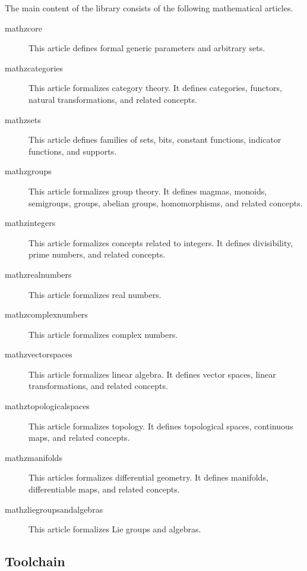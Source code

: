 \documentclass{amsart}
\begin{document}
The main content of the library consists of the following mathematical articles.
\begin{description}
\item[mathz\-core] This article defines formal generic parameters and arbitrary sets.
\item[mathz\-categories] This article formalizes category theory.
It defines categories, functors, natural transformations, and related concepts.
\item[mathz\-sets] This article defines families of sets, bits, constant functions, indicator functions, and supports.
\item[mathz\-groups] This article formalizes group theory.
It defines magmas, monoids, semigroups, groups, abelian groups, homomorphisms, and related concepts.
\item[mathz\-integers] This article formalizes concepts related to integers. It defines divisibility, prime numbers, and related concepts.
\item[mathz\-real\-numbers] This article formalizes real numbers.
\item[mathz\-complex\-numbers] This article formalizes complex numbers.
\item[mathz\-vector\-spaces] This article formalizes linear algebra. It defines vector spaces, linear transformations, and related concepts.
\item[mathz\-topological\-spaces] This article formalizes topology. It defines topological spaces, continuous maps, and related concepts.
\item[mathz\-manifolds] This articles formalizes differential geometry. It defines manifolds, differentiable maps, and related concepts.
\item[mathz\-lie\-groups\-and\-algebras] This article formalizes Lie groups and algebras.
\end{description}

\subsection{Toolchain}
\end{document}
